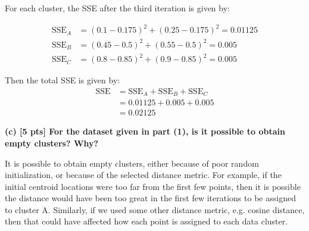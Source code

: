 For each cluster, the SSE after the third iteration is given by:

\begin{align}
  \text{SSE}_A &= (0.1-0.175)^2 + (0.25-0.175)^2 = 0.01125 \nonumber \\
  \text{SSE}_B &= (0.45-0.5)^2 + (0.55-0.5)^2 = 0.005 \nonumber \\
  \text{SSE}_C &= (0.8-0.85)^2 + (0.9-0.85)^2 = 0.005 \label{eq:q3b_1}
\end{align}

Then the total SSE is given by:
\begin{align}
  \text{SSE} &= \text{SSE}_A + \text{SSE}_B + \text{SSE}_C \nonumber \\
  &= 0.01125 + 0.005 + 0.005 \nonumber \\
  &= 0.02125 \label{eq:q3b_2}
\end{align}

\textbf{(c) [5 pts] For the dataset given in part (1), is it possible to obtain empty clusters? Why?}

It is possible to obtain empty clusters, either because of poor random initialization, or because of the selected distance metric. For example, if the initial centroid locations were too far from the first few points, then it is possible the distance would have been too great in the first few iterations to be assigned to cluster A. Similarly, if we used some other distance metric, e.g. cosine distance, then that could have affected how each point is assigned to each data cluster.
